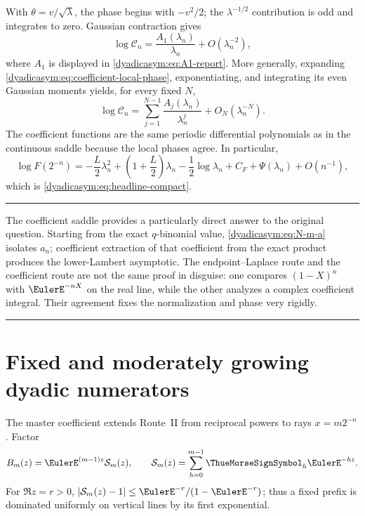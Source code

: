 \documentclass[11pt,oneside]{article}
\theoremstyle{definition}
\theoremstyle{remark}
\newenvironment{boxedremark}{%
  \par\smallskip\noindent\begin{center}\begin{minipage}{0.94\textwidth}%
  \color{black}\hrule\vspace{0.6em}\small
}{%
  \vspace{0.6em}\hrule\end{minipage}\end{center}\smallskip
}
\begin{document}
With $\theta=v/\sqrt\lambda$, the phase begins with $-v^2/2$; the
$\lambda^{-1/2}$ contribution is odd and integrates to zero.  Gaussian contraction gives
\begin{equation}
 \log\mathcal C_n
 =\frac{A_1(\lambda_n)}{\lambda_n}+O(\lambda_n^{-2}),      \label{dyadicasym:eq:Cn-first}
\end{equation}
where $A_1$ is displayed in \eqref{dyadicasym:eq:A1-report}.  More generally, expanding
\eqref{dyadicasym:eq:coefficient-local-phase}, exponentiating, and integrating its even
Gaussian moments yields, for every fixed $N$,
\begin{equation}
 \log\mathcal C_n
 =\sum_{j=1}^{N-1}\frac{A_j(\lambda_n)}{\lambda_n^j}
 +O_N(\lambda_n^{-N}).                                    \label{dyadicasym:eq:Cn-all-orders}
\end{equation}
The coefficient functions are the same periodic differential polynomials as in the
continuous saddle because the local phases agree.  In particular,
\begin{equation}
 \log F(2^{-n})=
 -\frac L2\lambda_n^2+
 \left(1+\frac L2\right)\lambda_n-\frac12\log\lambda_n
 +C_F+\Psi(\lambda_n)+O(n^{-1}),                           \label{dyadicasym:eq:saddle-final}
\end{equation}
which is \eqref{dyadicasym:eq:headline-compact}.

\begin{boxedremark}
The coefficient saddle provides a particularly direct answer to the original question.
Starting from the exact $q$-binomial value, \eqref{dyadicasym:eq:N-m-a} isolates $a_n$; coefficient
extraction of that coefficient from the exact product produces the lower-Lambert asymptotic.
The endpoint--Laplace route and the coefficient route are not the same proof in disguise:
one compares $(1-X)^n$ with $\EulerE^{-nX}$ on the real line, while the other analyzes a complex
coefficient integral.  Their agreement fixes the normalization and phase very rigidly.
\end{boxedremark}

\section{Fixed and moderately growing dyadic numerators}
\label{dyadicasym:sec:fixed-numerator}

The master coefficient extends Route~II from reciprocal powers to rays $x=m2^{-n}$.
Factor
\begin{equation}
 B_m(z)=\EulerE^{(m-1)z}\mathcal S_m(z),\qquad
 \mathcal S_m(z)=\sum_{h=0}^{m-1}\ThueMorseSignSymbol_h\EulerE^{-hz}.
 \label{dyadicasym:eq:fixed-prefix-factor}
\end{equation}
For $\Re z=r>0$,
$|\mathcal S_m(z)-1|\le\EulerE^{-r}/(1-\EulerE^{-r})$; thus a fixed prefix is dominated
uniformly on vertical lines by its first exponential.
\end{document}
